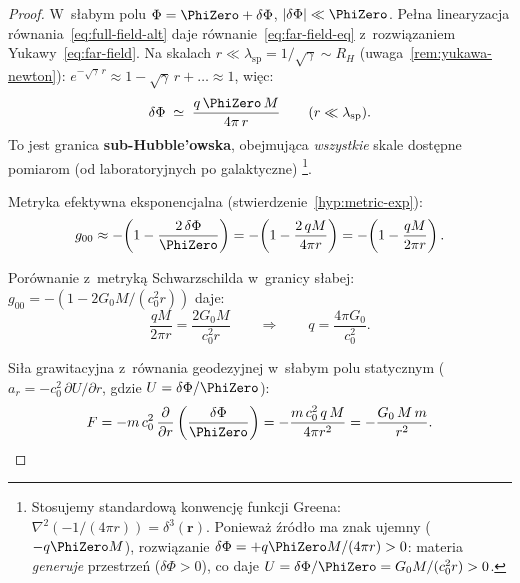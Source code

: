 \begin{proof}
W~s\l{}abym polu $\Phi = \PhiZero + \delta\Phi$,
$|\delta\Phi| \ll \PhiZero$. Pe\l{}na linearyzacja
r\'ownania~\eqref{eq:full-field-alt} daje
r\'ownanie~\eqref{eq:far-field-eq} z~rozwi\k{a}zaniem
Yukawy~\eqref{eq:far-field}.
Na skalach $r \ll \lambda_{\mathrm{sp}} = 1/\sqrt\gamma \sim R_H$
(uwaga~\ref{rem:yukawa-newton}):
$e^{-\sqrt\gamma\,r} \approx 1 - \sqrt\gamma\,r + \ldots
\approx 1$, wi\k{e}c:
\begin{equation}
  \delta\Phi \;\simeq\; \frac{q\,\PhiZero\,M}{4\pi\,r}
  \qquad (r \ll \lambda_{\mathrm{sp}}).
\end{equation}
To jest granica \textbf{sub-Hubble'owska}, obejmuj\k{a}ca
\emph{wszystkie} skale dost\k{e}pne pomiarom (od laboratoryjnych
po galaktyczne)%
\footnote{Stosujemy standardow\k{a} konwencj\k{e} funkcji Greena:
  $\nabla^2(-1/(4\pi r)) = \delta^3(\mathbf{r})$.
  Poniewa\.z \'zr\'od\l{}o ma znak ujemny ($-q\PhiZero M$),
  rozwi\k{a}zanie $\delta\Phi = +q\PhiZero M/(4\pi r) > 0$:
  materia \emph{generuje} przestrze\'n ($\delta\Phi > 0$),
  co daje $U = \delta\Phi/\PhiZero = G_0 M/(c_0^2 r) > 0$.}.

Metryka efektywna eksponencjalna
(stwierdzenie~\ref{hyp:metric-exp}):
\begin{equation}
  g_{00} \approx -\!\left(1 - \frac{2\,\delta\Phi}{\PhiZero}\right)
  = -\!\left(1 - \frac{2\,qM}{4\pi r}\right)
  = -\!\left(1 - \frac{qM}{2\pi r}\right).
\end{equation}

Por\'ownanie z~metryk\k{a} Schwarzschilda w~granicy s\l{}abej:
$g_{00} = -(1 - 2G_0 M/(c_0^2 r))$ daje:
\begin{equation}
  \frac{qM}{2\pi r} = \frac{2G_0 M}{c_0^2 r}
  \qquad\Longrightarrow\qquad
  q = \frac{4\pi G_0}{c_0^2}.
\end{equation}

Si\l{}a grawitacyjna z~r\'ownania geodezyjnej
w~s\l{}abym polu statycznym
($a_r = -c_0^2\,\partial U/\partial r$, gdzie $U = \delta\Phi/\PhiZero$):
\begin{equation}
  F = -m\,c_0^2\,\frac{\partial}{\partial r}
      \left(\frac{\delta\Phi}{\PhiZero}\right)
  = -\frac{m\,c_0^2\,q\,M}{4\pi r^2}
  = -\frac{G_0\,M\,m}{r^2}. \qedhere
\end{equation}
\end{proof}

